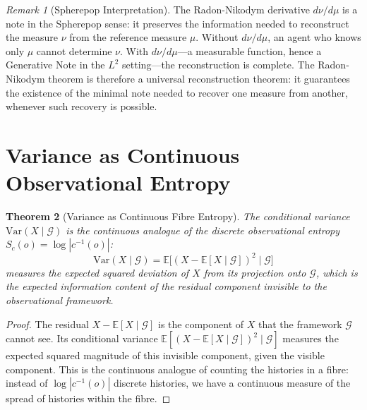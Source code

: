 \documentclass[12pt, a4paper, openany]{book}
\theoremstyle{plain}
\newtheorem{theorem}{Theorem}[chapter]
\theoremstyle{definition}
\theoremstyle{remark}
\newtheorem{remark}[theorem]{Remark}
\begin{document}
\begin{remark}[Spherepop Interpretation]
The Radon-Nikodym derivative $d\nu/d\mu$ is a note in the Spherepop sense: it
preserves the information needed to reconstruct the measure $\nu$ from the
reference measure $\mu$. Without $d\nu/d\mu$, an agent who knows only $\mu$
cannot determine $\nu$. With $d\nu/d\mu$---a measurable function, hence a
Generative Note in the $L^2$ setting---the reconstruction is complete. The
Radon-Nikodym theorem is therefore a universal reconstruction theorem: it
guarantees the existence of the minimal note needed to recover one measure from
another, whenever such recovery is possible.
\end{remark}

\section{Variance as Continuous Observational Entropy}

\begin{theorem}[Variance as Continuous Fibre Entropy]
The conditional variance $\mathrm{Var}(X \mid \mathcal{G})$ is the continuous
analogue of the discrete observational entropy $S_c(o) = \log |c^{-1}(o)|$:
\[
\mathrm{Var}(X \mid \mathcal{G}) = \mathbb{E}\bigl[(X - \mathbb{E}[X \mid \mathcal{G}])^2 \mid \mathcal{G}\bigr]
\]
measures the expected squared deviation of $X$ from its projection onto
$\mathcal{G}$, which is the expected information content of the residual
component invisible to the observational framework.
\end{theorem}

\begin{proof}
The residual $X - \mathbb{E}[X\mid\mathcal{G}]$ is the component of $X$
that the framework $\mathcal{G}$ cannot see. Its conditional variance
$\mathbb{E}[(X - \mathbb{E}[X\mid\mathcal{G}])^2 \mid \mathcal{G}]$ measures
the expected squared magnitude of this invisible component, given the visible
component. This is the continuous analogue of counting the histories in a
fibre: instead of $\log |c^{-1}(o)|$ discrete histories, we have a continuous
measure of the spread of histories within the fibre.
\end{proof}
\end{document}
